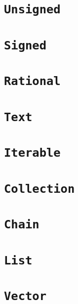 \def\Section#1{\section{\tt{#1}}}

\Section{Unsigned}

\Section{Signed}

\Section{Rational}

\Section{Text}

\Section{Iterable}

\Section{Collection}

\Section{Chain}

\Section{List}

\vspace{\baselineskip}

\Section{Vector}
